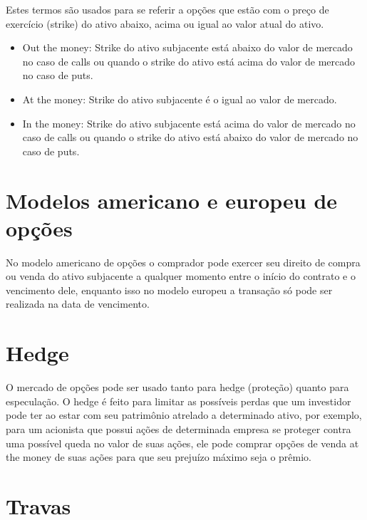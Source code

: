 \documentclass[]{book}
\providecommand{\tightlist}{%
  \setlength{\itemsep}{0pt}\setlength{\parskip}{0pt}}
\theoremstyle{definition}
\theoremstyle{definition}
\theoremstyle{definition}
\theoremstyle{remark}
\begin{document}
Estes termos são usados para se referir a opções que estão com o preço de exercício (strike) do ativo abaixo, acima ou igual ao valor atual do ativo.

\begin{itemize}
\tightlist
\item
  Out the money: Strike do ativo subjacente está abaixo do valor de mercado no caso de calls ou quando o strike do ativo está acima do valor de mercado no caso de puts.\\
\item
  At the money: Strike do ativo subjacente é o igual ao valor de mercado.
\item
  In the money: Strike do ativo subjacente está acima do valor de mercado no caso de calls ou quando o strike do ativo está abaixo do valor de mercado no caso de puts.
\end{itemize}

\hypertarget{modelos-americano-e-europeu-de-opcoes}{%
\section{Modelos americano e europeu de opções}\label{modelos-americano-e-europeu-de-opcoes}}

No modelo americano de opções o comprador pode exercer seu direito de compra ou venda do ativo subjacente a qualquer momento entre o início do contrato e o vencimento dele, enquanto isso no modelo europeu a transação só pode ser realizada na data de vencimento.

\hypertarget{hedge}{%
\section{Hedge}\label{hedge}}

O mercado de opções pode ser usado tanto para hedge (proteção) quanto para especulação. O hedge é feito para limitar as possíveis perdas que um investidor pode ter ao estar com seu patrimônio atrelado a determinado ativo, por exemplo, para um acionista que possui ações de determinada empresa se proteger contra uma possível queda no valor de suas ações, ele pode comprar opções de venda at the money de suas ações para que seu prejuízo máximo seja o prêmio.

\hypertarget{travas}{%
\section{Travas}\label{travas}}
\end{document}
